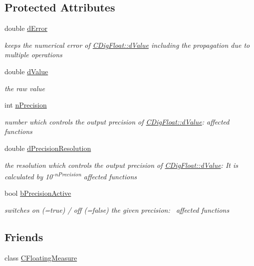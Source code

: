 \subsection*{Protected Attributes}
\begin{DoxyCompactItemize}
\item 
double \hyperlink{classCDigFloat_a25eb3782d1e727ff007a48f8308e3d4d}{d\+Error}
\begin{DoxyCompactList}\small\item\em keeps the numerical error of \hyperlink{classCDigFloat_a4bbe69e30dd4e20527362493aa9aaf96}{C\+Dig\+Float\+::d\+Value} including the propagation due to multiple operations \end{DoxyCompactList}\item 
double \hyperlink{classCDigFloat_a4bbe69e30dd4e20527362493aa9aaf96}{d\+Value}
\begin{DoxyCompactList}\small\item\em the raw value \end{DoxyCompactList}\item 
int \hyperlink{classCDigFloat_ad580654be35246d14c91482581c0bc11}{n\+Precision}
\begin{DoxyCompactList}\small\item\em number which controls the output precision of \hyperlink{classCDigFloat_a4bbe69e30dd4e20527362493aa9aaf96}{C\+Dig\+Float\+::d\+Value}\+: affected functions \end{DoxyCompactList}\item 
double \hyperlink{classCDigFloat_a7f9809fa0b25da57f5c8c18a02b7d1a7}{d\+Precision\+Resolution}
\begin{DoxyCompactList}\small\item\em the resolution which controls the output precision of \hyperlink{classCDigFloat_a4bbe69e30dd4e20527362493aa9aaf96}{C\+Dig\+Float\+::d\+Value}\+: It is calculated by 10\textsuperscript{-\/n\+Precision} affected functions \end{DoxyCompactList}\item 
bool \hyperlink{classCDigFloat_aa1f6ed0312a2aa6ae5ee2abd195adefc}{b\+Precision\+Active}
\begin{DoxyCompactList}\small\item\em switches on (=true) / off (=false) the given precision\+:~\newline
 affected functions \end{DoxyCompactList}\end{DoxyCompactItemize}
\subsection*{Friends}
\begin{DoxyCompactItemize}
\item 
class \hyperlink{classCDigFloat_a7e23751869edf87edc0feeb80eda78d9}{C\+Floating\+Measure}
\end{DoxyCompactItemize}


